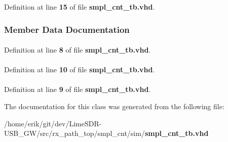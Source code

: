 Definition at line {\bf 15} of file {\bf smpl\+\_\+cnt\+\_\+tb.\+vhd}.



\subsubsection{Member Data Documentation}
\paragraph[{ieee}]{\hspace{0.3cm}{\ttfamily [Library]}}\label{classsmpl__cnt__tb_a0a6af6eef40212dbaf130d57ce711256}


Definition at line {\bf 8} of file {\bf smpl\+\_\+cnt\+\_\+tb.\+vhd}.

\paragraph[{numeric\+\_\+std}]{\hspace{0.3cm}{\ttfamily [Package]}}\label{classsmpl__cnt__tb_a2edc34402b573437d5f25fa90ba4013e}


Definition at line {\bf 10} of file {\bf smpl\+\_\+cnt\+\_\+tb.\+vhd}.

\paragraph[{std\+\_\+logic\+\_\+1164}]{\hspace{0.3cm}{\ttfamily [Package]}}\label{classsmpl__cnt__tb_acd03516902501cd1c7296a98e22c6fcb}


Definition at line {\bf 9} of file {\bf smpl\+\_\+cnt\+\_\+tb.\+vhd}.



The documentation for this class was generated from the following file\+:\begin{DoxyCompactItemize}
\item 
/home/erik/git/dev/\+Lime\+S\+D\+R-\/\+U\+S\+B\+\_\+\+G\+W/src/rx\+\_\+path\+\_\+top/smpl\+\_\+cnt/sim/{\bf smpl\+\_\+cnt\+\_\+tb.\+vhd}\end{DoxyCompactItemize}
